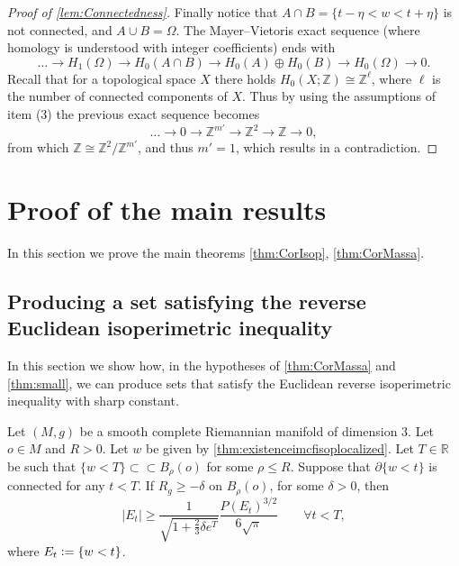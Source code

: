 \documentclass[a4paper,12pt,reqno]{amsart}
\numberwithin{equation}{section}
\theoremstyle{plain}
\theoremstyle{definition}
\theoremstyle{remark}
\newcommand{\R}{\mathbb{R}}
\newcommand{\eqdef}{\ensuremath{\vcentcolon=}}
\begin{document}
{\begin{proof}[Proof of \cref{lem:Connectedness}]
         Finally notice that $A\cap B=\{t-\eta<w<t+\eta\}$ is not connected, and $A\cup B=\Omega$. The Mayer--Vietoris exact sequence (where homology is understood with integer coefficients) ends with 
         \[
         \ldots \rightarrow H_1(\Omega) \rightarrow H_0(A\cap B) \rightarrow H_0(A)\oplus H_0(B) \rightarrow H_0(\Omega) \rightarrow 0.
         \]
         Recall that for a topological space $X$ there holds $H_0(X;\mathbb Z)\cong \mathbb Z^\ell$, where $\ell$ is the number of connected components of $X$. Thus by using the assumptions of item (3) the previous exact sequence becomes 
         \[
         \ldots \rightarrow 0 \rightarrow \mathbb Z^{m'}\rightarrow \mathbb Z^2 \rightarrow \mathbb Z \rightarrow 0,
         \]
         from which $\mathbb Z\cong \mathbb Z^2 / \mathbb Z^{m'}$, and thus $m'=1$, which results in a contradiction.
     \end{proof}

\section{Proof of the main results}\label{sec:Proofs}

In this section we prove the main theorems \cref{thm:CorIsop}, \cref{thm:CorMassa}.

\subsection{Producing a set satisfying the reverse Euclidean isoperimetric inequality}\label{sec:Producingset}

In this section we show how, in the hypotheses of \cref{thm:CorMassa} and \cref{thm:small}, we can produce sets  that satisfy the Euclidean reverse isoperimetric inequality with sharp constant.

\begin{lemma}\label{lem:AlmostShi}
    Let $(M,g)$ be a smooth complete Riemannian manifold of dimension $3$. Let $o \in M$ and $R>0$. Let $w$ be given by \cref{thm:existenceimcfisoplocalized}.
    Let $T \in\R$ be such that $\{w<T\}\subset\subset B_\rho(o)$ for some $\rho\le R$. Suppose that $\partial \{w < t\}$ is connected for any $t <T$. If $R_g\geq -\delta$ on $B_\rho(o)$, for some $\delta>0$, then
    \begin{equation}
    \label{eq:quasishi}
    |E_t|\geq \frac{1}{\sqrt{1+\frac{2}{3}\delta e^T}}\frac{P(E_t)^{3/2}}{6\sqrt{\pi}}\qquad \forall t<T,
    \end{equation}
    where $E_t \eqdef \{ w <t\}$.
\end{lemma}

}
\end{document}
